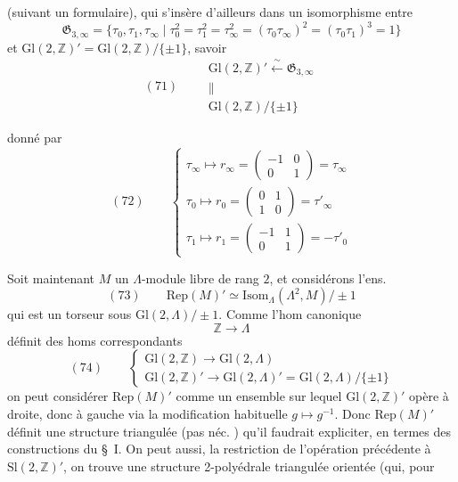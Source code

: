 \documentclass[11pt,a4paper]{article}
\begin{document}
(suivant un formulaire), qui s'insère d'ailleurs dans un isomorphisme entre
\[
\mathfrak{G}_{3,\infty} = \{\tau_0, \tau_1, \tau_\infty \mid \tau_0^2 = \tau_1^2 = \tau_\infty^2 = (\tau_0\tau_\infty)^2 = (\tau_0\tau_1)^3 = 1\}
\]
et $\mathrm{Gl}(2,\mathbb{Z})' = \mathrm{Gl}(2,\mathbb{Z})/\{\pm 1\}$, savoir
\[
(71)\qquad
\begin{array}{c}
\mathrm{Gl}(2,\mathbb{Z})' \xleftarrow{\ \sim\ } \mathfrak{G}_{3,\infty} \\
\| \\
\mathrm{Gl}(2,\mathbb{Z})/\{\pm 1\}
\end{array}
\]


donné par
\[
(72)\qquad
\begin{cases}
\tau_\infty \longmapsto r_\infty = \begin{pmatrix} -1 & 0 \\ 0 & 1 \end{pmatrix} = \tau_\infty \\[4pt]
\tau_0 \longmapsto r_0 = \begin{pmatrix} 0 & 1 \\ 1 & 0 \end{pmatrix} = \tau'_\infty \\[4pt]
\tau_1 \longmapsto r_1 = \begin{pmatrix} -1 & 1 \\ 0 & 1 \end{pmatrix} = -\tau'_0
\end{cases}
\]

 Soit maintenant $M$ un $\Lambda$-module libre de rang $2$, et considérons l'ens.
\[
(73)\qquad \mathrm{Rep}(M)' \simeq \mathrm{Isom}_\Lambda(\Lambda^2, M)/\pm 1
\]
qui est un torseur  sous $\mathrm{Gl}(2,\Lambda)/\pm 1$. Comme l'hom canonique
\[
\mathbb{Z} \longrightarrow \Lambda
\]
définit des homs correspondants
\[
(74)\qquad
\begin{cases}
\mathrm{Gl}(2,\mathbb{Z}) \longrightarrow \mathrm{Gl}(2,\Lambda) \\
\mathrm{Gl}(2,\mathbb{Z})' \longrightarrow \mathrm{Gl}(2,\Lambda)' = \mathrm{Gl}(2,\Lambda)/\{\pm 1\}
\end{cases}
\]
on peut considérer $\mathrm{Rep}(M)'$ comme un ensemble sur lequel $\mathrm{Gl}(2,\mathbb{Z})'$ opère à droite, donc à gauche via la modification habituelle $g \mapsto g^{-1}$. Donc $\mathrm{Rep}(M)'$ définit une structure  triangulée (pas néc. ) qu'il faudrait expliciter, en termes des constructions du §~I. On peut aussi,   la restriction de l'opération précédente à $\mathrm{Sl}(2,\mathbb{Z})'$, on trouve une structure 2-polyédrale triangulée orientée (qui, pour
\end{document}
